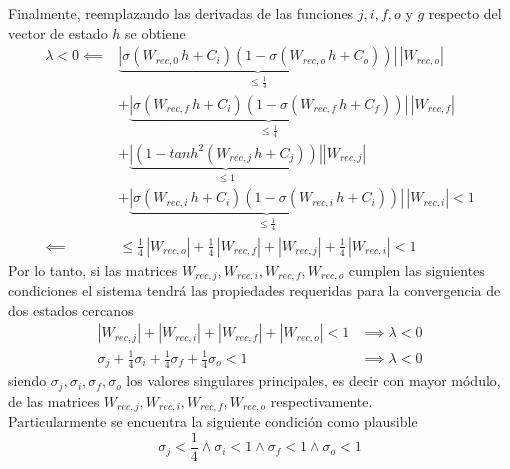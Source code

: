 \documentclass{article}
\begin{document}
\begin{appendices}
\begin{equation*}
		\end{equation*}
		Finalmente, reemplazando las derivadas de las funciones $j, i, f, o$ y $g$ respecto del vector de estado $h$ se obtiene
		\begin{equation*}
		\begin{split}
		\lambda < 0 \impliedby & \underbrace{|\sigma(W_{rec,0} \, h + C_i) (1-\sigma(W_{rec,o} \, h + C_o)) |}_{\le \frac{1}{4}} \, |W_{rec,o}| \\
		&+ \underbrace{|\sigma(W_{rec,f} \, h + C_i) (1-\sigma(W_{rec,f} \, h + C_f)) |}_{\le \frac{1}{4}} \, |W_{rec,f}| \\
		&+ \underbrace{|(1- tanh^2(W_{rec,j} \, h + C_j))|}_{\le 1} |W_{rec,j}| \\
		&+ \underbrace{|\sigma(W_{rec,i} \, h + C_i) (1-\sigma(W_{rec,i} \, h + C_i)) |}_{\le \frac{1}{4}} \, |W_{rec,i}| < 1\\
		\impliedby & \le \frac{1}{4} \, |W_{rec,o}| + \frac{1}{4} \, |W_{rec,f}| + |W_{rec,j}| + \frac{1}{4} \, |W_{rec,i}| < 1
		\end{split}
		\end{equation*}
		Por lo tanto, si las matrices $W_{rec,j}, W_{rec,i}, W_{rec,f}, W_{rec,o}$ cumplen las siguientes condiciones el sistema tendrá las propiedades requeridas para la convergencia de dos estados cercanos
		\begin{equation*}
		\begin{split}
		|W_{rec,j}| + |W_{rec,i}| + |W_{rec,f}| + |W_{rec,o}| < 1 &\implies \lambda < 0\\
		\sigma_j + \frac{1}{4} \sigma_i + \frac{1}{4} \sigma_f + \frac{1}{4} \sigma_o < 1 &\implies \lambda < 0
		\end{split}
		\end{equation*}
		siendo $\sigma_j , \sigma_i , \sigma_f , \sigma_o $ los valores singulares principales, es decir con mayor módulo, de las matrices $W_{rec,j}, W_{rec,i}, W_{rec,f}, W_{rec,o}$ respectivamente.\\ Particularmente se encuentra la siguiente condición como plausible 
		\begin{equation*}
		\sigma_j < \frac{1}{4} \land \sigma_i < 1 \land \sigma_f < 1 \land \sigma_o < 1
		\end{equation*}
		
	\end{appendices}
	
	\pagebreak
	
	
	\printbibliography[title=Bibliografía]
	
	
	
\end{document}

